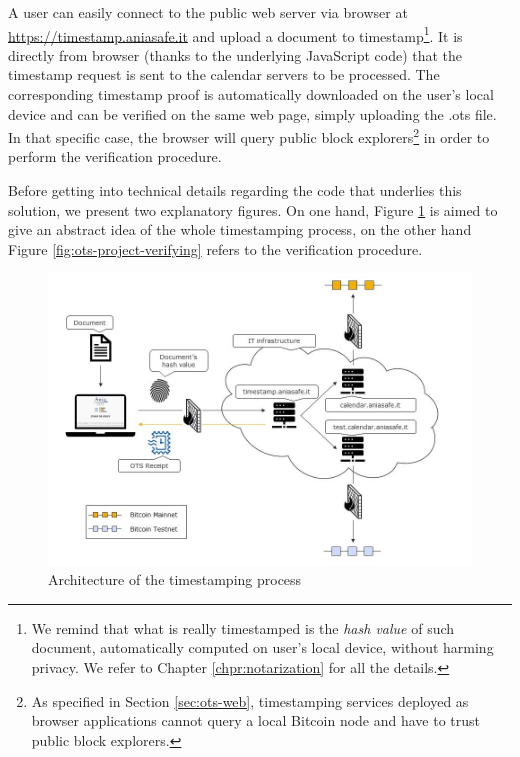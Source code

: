 \bigskip
\noindent
A user can easily connect to the public web server via browser at \url{https://timestamp.aniasafe.it} and upload a document to timestamp\footnote{We remind that what is really timestamped is the \textit{hash value} of such document, automatically computed on user's local device, without harming privacy. We refer to Chapter \ref{chpr:notarization} for all the details.}. It is directly from browser (thanks to the underlying JavaScript code) that the timestamp request is sent to the calendar servers to be processed. The corresponding timestamp proof is automatically downloaded on the user's local device and can be verified on the same web page, simply uploading the \colorbox{light-gray}{.ots} file. In that specific case, the browser will query public block explorers\footnote{As specified in Section \ref{sec:ots-web}, timestamping services deployed as browser applications cannot query a local Bitcoin node and have to trust public block explorers.} in order to perform the verification procedure. 

\bigskip
\noindent
Before getting into technical details regarding the code that underlies this solution, we present two explanatory figures. On one hand, Figure \ref{fig:ots-project-stamping} is aimed to give an abstract idea of the whole timestamping process, on the other hand Figure \ref{fig:ots-project-verifying} refers to the verification procedure.

\begin{figure}[!htb]
    \centering
	\includegraphics[width=1\linewidth]{Images/project-stamping.jpg}
	\caption{Architecture of the timestamping process}
	\label{fig:ots-project-stamping}
\end{figure}


